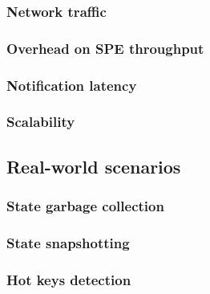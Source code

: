 \subsubsection{Network traffic}

\subsubsection{Overhead on SPE throughput}

\subsubsection{Notification latency}

\subsubsection{Scalability}

\subsection{Real-world scenarios} \label{real-world-scenarios}

\subsubsection{State garbage collection}

\subsubsection{State snapshotting}

\subsubsection{Hot keys detection}



